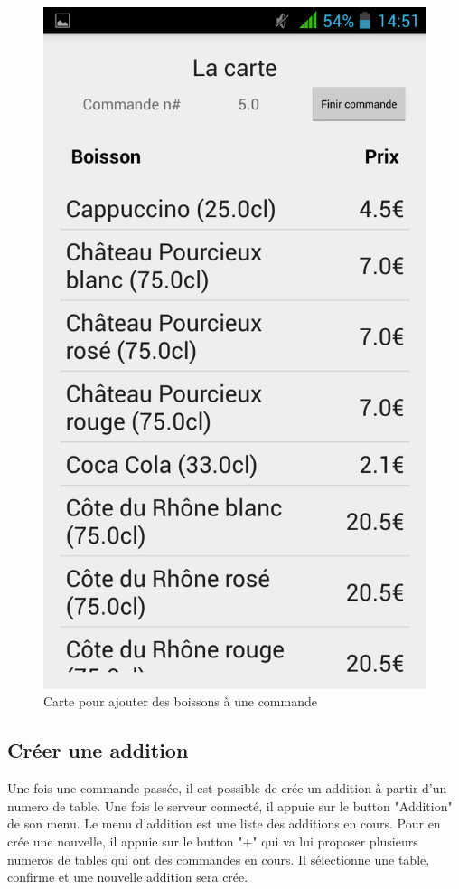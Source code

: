 \begin{figure}[H]
	\centering
	\includegraphics[scale=0.15]{img/new-order.png}
	\caption{Carte pour ajouter des boissons à une commande}
	\label{fig:drink-list}
\end{figure}

\subsection{Créer une addition}
Une fois une commande passée, il est possible de crée un addition à partir d'un numero de table. Une fois le serveur connecté, il appuie sur le button "Addition" de son menu. Le menu d'addition est une liste des additions en cours. Pour en crée une nouvelle, il appuie sur le button "+" qui va lui proposer plusieurs numeros de tables qui ont des commandes en cours. Il sélectionne une table, confirme et une nouvelle addition sera crée.

